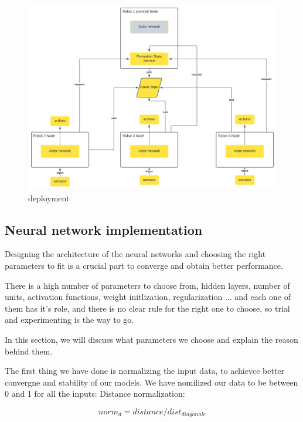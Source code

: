 \documentclass[12pt]{extarticle}
\begin{document}
 \begin{figure}[h!]  
\centering
\includegraphics[scale=1.2]{deployment}
\caption[deployment]{deployment}
\end{figure}










 
\newpage




\subsection{Neural network implementation}
Designing the architecture of the neural networks and choosing the right parameters to fit is a crucial part to converge and obtain better performance.

There is a high  number of  parameters to choose from,  hidden layers, number of units, activation functions, weight initlization, regularization ... and each one of them has it's role, and there is no clear rule for the right one to choose, so trial and experimenting is the way to go.

In this section, we will discuss what parameters we choose and explain the reason behind them.

The first thing we have done is normalizing the input data, to achievce better convergne and stability of our models.
We have nomilized our data to be between 0 and 1 for all the inputs:
\pagebreak
Distance normalization:

  \begin{equation} \label{dist_norm}
     norm_d=distance/dist_{diagonale} 
   \end{equation}
   
\end{document}

